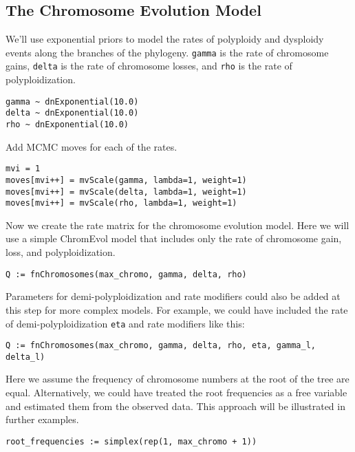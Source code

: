 \bigskip
\subsection{The Chromosome Evolution Model}


We'll use exponential priors to model the rates of polyploidy and 
dysploidy events along the branches of the phylogeny.
\texttt{gamma} is the rate of chromosome gains,
\texttt{delta} is the rate of chromosome losses, and
\texttt{rho} is the rate of polyploidization.
{\tt \begin{snugshade*}
\begin{lstlisting}
gamma ~ dnExponential(10.0)
delta ~ dnExponential(10.0)
rho ~ dnExponential(10.0)
\end{lstlisting}
\end{snugshade*}}

Add MCMC moves for each of the rates. 
{\tt \begin{snugshade*}
\begin{lstlisting}
mvi = 1
moves[mvi++] = mvScale(gamma, lambda=1, weight=1)
moves[mvi++] = mvScale(delta, lambda=1, weight=1)
moves[mvi++] = mvScale(rho, lambda=1, weight=1)
\end{lstlisting}
\end{snugshade*}}

Now we create the rate matrix for the chromosome evolution model.
Here we will use a simple ChromEvol model that includes
only the rate of chromosome gain, loss, and polyploidization.
{\tt \begin{snugshade*}
\begin{lstlisting}
Q := fnChromosomes(max_chromo, gamma, delta, rho)
\end{lstlisting}
\end{snugshade*}}

Parameters for demi-polyploidization and rate modifiers could also
be added at this step for more complex models. For example, we
could have included the rate of demi-polyploidization \texttt{eta} 
and rate modifiers like this:
{\tt \begin{snugshade*}
\begin{lstlisting}
Q := fnChromosomes(max_chromo, gamma, delta, rho, eta, gamma_l, delta_l)
\end{lstlisting}
\end{snugshade*}}

Here we assume the frequency of chromosome numbers at the root of the tree
are equal. Alternatively, we could have treated the root frequencies
as a free variable and estimated them from the observed data. 
This approach will be illustrated in further examples.
{\tt \begin{snugshade*}
\begin{lstlisting}
root_frequencies := simplex(rep(1, max_chromo + 1))
\end{lstlisting}
\end{snugshade*}}

